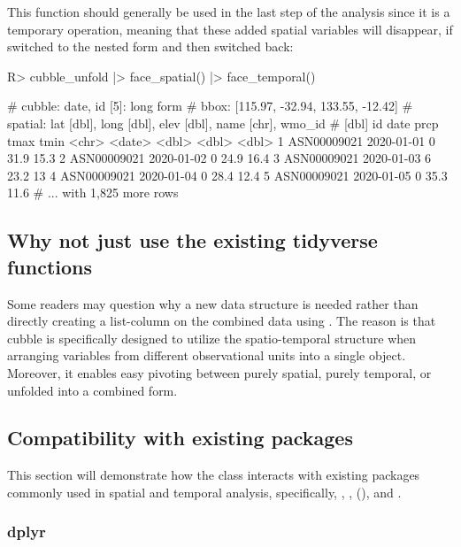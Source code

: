 \documentclass[
]{jss}
\begin{document}
This function should generally be used in the last step of the analysis since it is a temporary operation, meaning that these added spatial variables will disappear, if switched to the nested form and then switched back:

\begin{CodeChunk}
\begin{CodeInput}
R> cubble_unfold |> face_spatial() |> face_temporal()
\end{CodeInput}
\begin{CodeOutput}
# cubble:  date, id [5]: long form
# bbox:    [115.97, -32.94, 133.55, -12.42]
# spatial: lat [dbl], long [dbl], elev [dbl], name [chr], wmo_id
#   [dbl]
  id          date        prcp  tmax  tmin
  <chr>       <date>     <dbl> <dbl> <dbl>
1 ASN00009021 2020-01-01     0  31.9  15.3
2 ASN00009021 2020-01-02     0  24.9  16.4
3 ASN00009021 2020-01-03     6  23.2  13  
4 ASN00009021 2020-01-04     0  28.4  12.4
5 ASN00009021 2020-01-05     0  35.3  11.6
# ... with 1,825 more rows
\end{CodeOutput}
\end{CodeChunk}

\hypertarget{tidyverse}{%
\subsection{Why not just use the existing tidyverse functions}\label{tidyverse}}

Some readers may question why a new data structure is needed rather than directly creating a list-column on the combined data using . The reason is that cubble is specifically designed to utilize the spatio-temporal structure when arranging variables from different observational units into a single object. Moreover, it enables easy pivoting between purely spatial, purely temporal, or unfolded into a combined form.

\hypertarget{compact}{%
\subsection{Compatibility with existing packages}\label{compact}}

This section will demonstrate how the  class interacts with existing packages commonly used in spatial and temporal analysis, specifically, , ,  (), and .

\hypertarget{dplyr}{%
\subsubsection{dplyr}\label{dplyr}}
\end{document}
